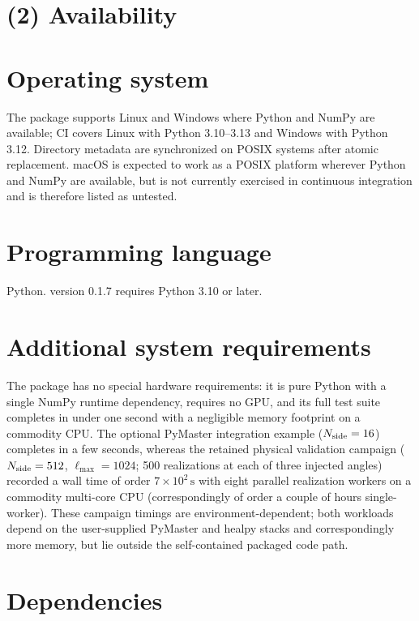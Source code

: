 \section*{(2) Availability}
\vspace{0.5cm}

\section*{Operating system}

The package supports Linux and Windows where Python and NumPy are available;
CI covers Linux with Python 3.10--3.13 and Windows with Python 3.12. Directory
metadata are synchronized on POSIX systems after atomic replacement. macOS is
expected to work as a POSIX platform wherever Python and NumPy are available,
but is not currently exercised in continuous integration and is therefore
listed as untested.

\section*{Programming language}

Python. \software{} version 0.1.7 requires Python 3.10 or later.

\section*{Additional system requirements}

The package has no special hardware requirements: it is pure Python with a
single NumPy runtime dependency, requires no GPU, and its full test suite
completes in under one second with a negligible memory footprint on a commodity
CPU. The optional PyMaster integration example (\(N_{\rm side}=16\)) completes
in a few seconds, whereas the retained physical validation campaign
(\(N_{\rm side}=512\), \(\ell_{\max}=1024\); 500 realizations at each of three
injected angles) recorded a wall time of order \(7\times10^{2}\,\mathrm{s}\)
with eight parallel realization workers on a commodity multi-core CPU
(correspondingly of order a couple of hours single-worker). These campaign
timings are environment-dependent; both workloads depend on the user-supplied
PyMaster and healpy stacks and correspondingly more memory, but lie outside the
self-contained packaged code path.

\section*{Dependencies}

